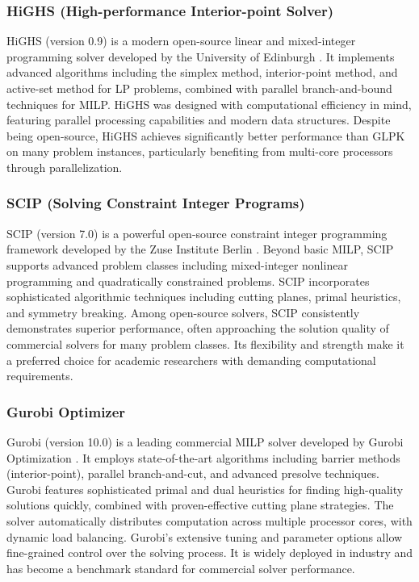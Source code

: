 \documentclass[11pt,a4paper]{article}
\begin{document}
\subsubsection{HiGHS (High-performance Interior-point Solver)}
HiGHS (version 0.9) is a modern open-source linear and mixed-integer programming solver developed by the University of Edinburgh \cite{highs2023}. It implements advanced algorithms including the simplex method, interior-point method, and active-set method for LP problems, combined with parallel branch-and-bound techniques for MILP. HiGHS was designed with computational efficiency in mind, featuring parallel processing capabilities and modern data structures. Despite being open-source, HiGHS achieves significantly better performance than GLPK on many problem instances, particularly benefiting from multi-core processors through parallelization.

\subsubsection{SCIP (Solving Constraint Integer Programs)}
SCIP (version 7.0) is a powerful open-source constraint integer programming framework developed by the Zuse Institute Berlin \cite{scip2023}. Beyond basic MILP, SCIP supports advanced problem classes including mixed-integer nonlinear programming and quadratically constrained problems. SCIP incorporates sophisticated algorithmic techniques including cutting planes, primal heuristics, and symmetry breaking. Among open-source solvers, SCIP consistently demonstrates superior performance, often approaching the solution quality of commercial solvers for many problem classes. Its flexibility and strength make it a preferred choice for academic researchers with demanding computational requirements.

\subsubsection{Gurobi Optimizer}
Gurobi (version 10.0) is a leading commercial MILP solver developed by Gurobi Optimization \cite{gurobi2024}. It employs state-of-the-art algorithms including barrier methods (interior-point), parallel branch-and-cut, and advanced presolve techniques. Gurobi features sophisticated primal and dual heuristics for finding high-quality solutions quickly, combined with proven-effective cutting plane strategies. The solver automatically distributes computation across multiple processor cores, with dynamic load balancing. Gurobi's extensive tuning and parameter options allow fine-grained control over the solving process. It is widely deployed in industry and has become a benchmark standard for commercial solver performance.
\end{document}
